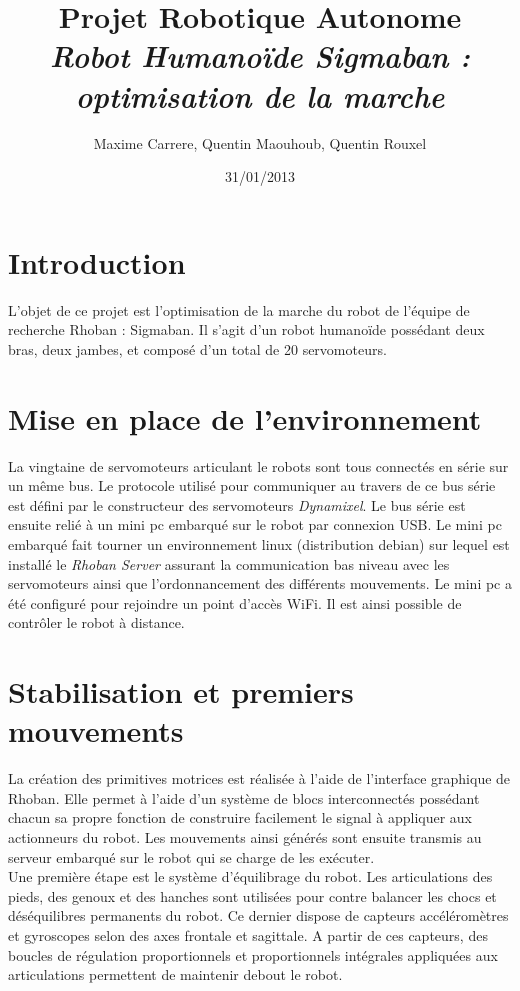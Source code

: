 \documentclass[11pt]{article}
\title{Projet Robotique Autonome\\
\textit{Robot Humanoïde Sigmaban : optimisation de la marche}}
\author{Maxime Carrere, Quentin Maouhoub, Quentin Rouxel}
\date{31/01/2013}
\begin{document}
\maketitle

\section{Introduction}

L'objet de ce projet est l'optimisation de la marche du robot de l'équipe 
de recherche Rhoban : Sigmaban. Il s'agit d'un robot humanoïde possédant deux bras,
deux jambes, et composé d'un total de 20 servomoteurs.

\section{Mise en place de l'environnement}

La vingtaine de servomoteurs articulant le robots sont tous connectés en série sur un même 
bus. Le protocole utilisé pour communiquer au travers de ce bus série est défini par le
constructeur des servomoteurs \textit{Dynamixel}. Le bus série est ensuite relié à un mini pc
embarqué sur le robot par connexion USB. Le mini pc embarqué fait tourner un environnement linux
(distribution debian) sur lequel est installé le \textit{Rhoban Server} assurant la communication
bas niveau avec les servomoteurs ainsi que l'ordonnancement des différents mouvements. Le mini pc
a été configuré pour rejoindre un point d'accès WiFi. Il est ainsi possible de contrôler le robot
à distance.

\section{Stabilisation et premiers mouvements}

La création des primitives motrices est réalisée à l'aide de l'interface graphique de Rhoban.
Elle permet à l'aide d'un système de blocs interconnectés possédant chacun sa propre fonction
de construire facilement le signal à appliquer aux actionneurs du robot. Les mouvements ainsi générés
sont ensuite transmis au serveur embarqué sur le robot qui se charge de les exécuter.\\

Une première étape est le système d'équilibrage du robot. Les articulations des pieds, des genoux 
et des hanches sont utilisées pour contre balancer les chocs et déséquilibres permanents
du robot. Ce dernier dispose de capteurs accéléromètres et gyroscopes selon des axes frontale et sagittale.
A partir de ces capteurs, des boucles de régulation proportionnels et proportionnels intégrales appliquées
aux articulations permettent de maintenir debout le robot.\\
\end{document}
